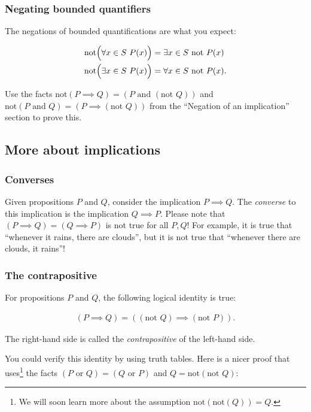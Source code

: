\subsubsection*{Negating bounded quantifiers}

The negations of bounded quantifications are what you expect:

\begin{align*}
    &\text{not}\Big( \forall x \in S \text{ } P(x) \Big) = \exists x \in S \text{ } \text{not } P(x) \\
    &\text{not}\Big( \exists x \in S \text{ } P(x) \Big) = \forall x \in S \text{ } \text{not } P(x).
\end{align*}

Use the facts $\text{not}(P \implies Q) = (P \text{ and } (\text{not } Q))$ and $\text{not}(P \text{ and } Q) = (P \implies (\text{not } Q))$ from the ``Negation of an implication'' section to prove this.

\newpage

\subsection*{More about implications}

\subsubsection*{Converses}

Given propositions $P$ and $Q$, consider the implication $P \implies Q$. The \textit{converse} to this implication is the implication $Q \implies P$. Please note that $(P \implies Q) = (Q \implies P)$ is not true for all $P, Q$! For example, it is true that ``whenever it rains, there are clouds'', but it is not true that ``whenever there are clouds, it rains''!

\subsubsection*{The contrapositive}

For propositions $P$ and $Q$, the following logical identity is true:

\begin{align*}
    (P \implies Q) = ((\text{not } Q) \implies (\text{not } P)).
\end{align*}

The right-hand side is called the \textit{contrapositive} of the left-hand side.

You could verify this identity by using truth tables. Here is a nicer proof that uses\footnote{We will soon learn more about the assumption $\text{not}(\text{not}(Q)) = Q$.} the facts $(P \text{ or } Q) = (Q \text{ or } P)$ and $Q = \text{not}(\text{not } Q)$:


